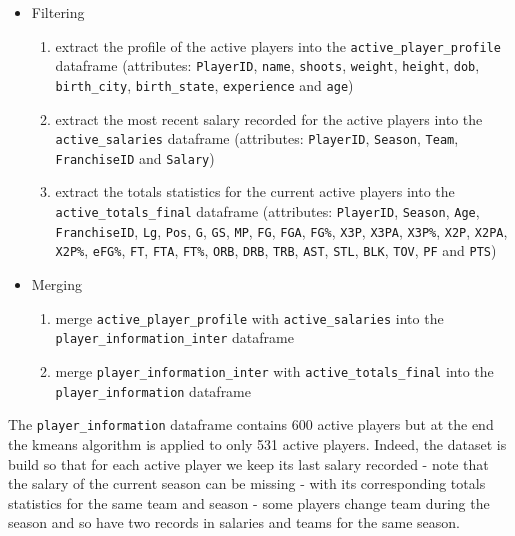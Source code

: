 \begin{itemize}
\item Filtering
	\begin{enumerate}
	\item extract the profile of the active players into the \texttt{active\_player\_profile} dataframe (attributes: \texttt{PlayerID}, \texttt{name}, \texttt{shoots}, \texttt{weight}, \texttt{height}, \texttt{dob}, \\ \texttt{birth\_city}, \texttt{birth\_state}, \texttt{experience} and \texttt{age})
	\item extract the most recent salary recorded for the active players into the \texttt{active\_salaries} dataframe (attributes: \texttt{PlayerID}, \texttt{Season}, \texttt{Team},\\ \texttt{FranchiseID} and \texttt{Salary})
	\item extract the totals statistics for the current active players into the \\ \texttt{active\_totals\_final} dataframe (attributes: \texttt{PlayerID}, \texttt{Season}, \texttt{Age},\\ \texttt{FranchiseID}, \texttt{Lg}, \texttt{Pos}, \texttt{G}, \texttt{GS}, \texttt{MP}, \texttt{FG}, \texttt{FGA}, \texttt{FG\%}, \texttt{X3P}, \texttt{X3PA}, \texttt{X3P\%}, \texttt{X2P}, \texttt{X2PA}, \texttt{X2P\%}, \texttt{eFG\%}, \texttt{FT}, \texttt{FTA}, \texttt{FT\%}, \texttt{ORB}, \texttt{DRB}, \texttt{TRB}, \texttt{AST}, \texttt{STL}, \texttt{BLK}, \texttt{TOV}, \texttt{PF} and \texttt{PTS})
	\end{enumerate}
\item Merging
	\begin{enumerate}
	\item merge \texttt{active\_player\_profile} with \texttt{active\_salaries} into the \\ \texttt{player\_information\_inter} dataframe
	\item merge \texttt{player\_information\_inter} with \texttt{active\_totals\_final} into the \texttt{player\_information} dataframe
	\end{enumerate}
\end{itemize}

The \texttt{player\_information} dataframe contains 600 active players but at the end the kmeans algorithm is applied to only 531 active players. Indeed, the dataset is build so that for each active player we keep its last salary recorded - note that the salary of the current season can be missing - with its corresponding totals statistics for the same team and season - some players change team during the season and so have two records in salaries and teams for the same season.

